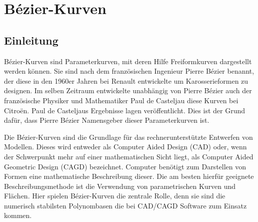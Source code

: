 %
%

\chapter{Bézier-Kurven}

\section{Einleitung}

Bézier-Kurven sind Parameterkurven, mit deren Hilfe Freiformkurven dargestellt werden können. Sie sind nach dem französischen Ingenieur Pierre Bézier benannt, der diese in den 1960er Jahren 
bei Renault entwickelte um Karosserieformen zu designen. Im selben Zeitraum entwickelte unabhängig von Pierre Bézier auch der französische Physiker und Mathematiker Paul de Casteljau diese Kurven bei Citroën. Paul de Casteljaus Ergebnisse lagen  veröffentlicht. Dies ist der Grund dafür, dass Pierre Bézier Namensgeber dieser Parameterkurven ist.\autocite{Farin:2002}

\bigskip


Die Bézier-Kurven sind die Grundlage für das rechnerunterstützte Entwerfen von Modellen. Dieses wird entweder als Computer Aided Design (CAD) oder, wenn der Schwerpunkt mehr auf einer mathematischen Sicht liegt, als Computer Aided Geometric Design (CAGD) bezeichnet. \autocite{Babovsky:2011} Computer benötigt zum Darstellen von Formen eine mathematische Beschreibung dieser. Die am besten hierfür geeignete Beschreibungsmethode ist die Verwendung von parametrischen Kurven und Flächen. Hier spielen Bézier-Kurven die zentrale Rolle, denn sie sind die numerisch stabilsten Polynombasen die bei CAD/CAGD Software zum Einsatz kommen.\autocite{Farin:2002}

\bigskip


